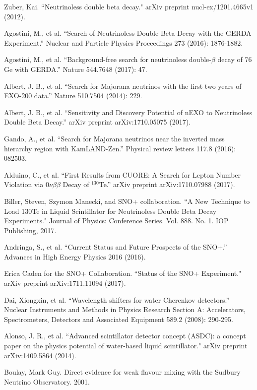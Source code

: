 \documentclass[preprint,12pt]{elsarticle}
\numberwithin{equation}{section}
\begin{document}
\begin{thebibliography}{00}
 Zuber, Kai. ``Neutrinoless double beta decay." arXiv preprint nucl-ex/1201.4665v1 (2012).

 Agostini, M., et al. ``Search of Neutrinoless Double Beta Decay with the GERDA Experiment.'' Nuclear and Particle Physics Proceedings 273 (2016): 1876-1882. 

 Agostini, M., et al. ``Background-free search for neutrinoless double-$\beta$ decay of 76 Ge with GERDA.'' Nature 544.7648 (2017): 47.

 Albert, J. B., et al. ``Search for Majorana neutrinos with the first two years of EXO-200 data.'' Nature 510.7504 (2014): 229.

 Albert, J. B., et al. ``Sensitivity and Discovery Potential of nEXO to Neutrinoless Double Beta Decay.'' arXiv preprint arXiv:1710.05075 (2017).


 Gando, A., et al. ``Search for Majorana neutrinos near the inverted mass hierarchy region with KamLAND-Zen.'' Physical review letters 117.8 (2016): 082503.

 Alduino, C., et al. ``First Results from CUORE: A Search for Lepton Number Violation via $0\nu\beta\beta$ Decay of $^{130}$Te.'' arXiv preprint arXiv:1710.07988 (2017).

Biller, Steven, Szymon Manecki, and SNO+ collaboration. ``A New Technique to Load 130Te in Liquid Scintillator for Neutrinoless Double Beta Decay Experiments." Journal of Physics: Conference Series. Vol. 888. No. 1. IOP Publishing, 2017.

 Andringa, S., et al. ``Current Status and Future Prospects of the SNO+.'' Advances in High Energy Physics 2016 (2016).

 Erica Caden for the SNO+ Collaboration. ``Status of the SNO+ Experiment." arXiv preprint arXiv:1711.11094 (2017).


 Dai, Xiongxin, et al. ``Wavelength shifters for water Cherenkov detectors.'' Nuclear Instruments and Methods in Physics Research Section A: Accelerators, Spectrometers, Detectors and Associated Equipment 589.2 (2008): 290-295.

 Alonso, J. R., et al. ``Advanced scintillator detector concept (ASDC): a concept paper on the physics potential of water-based liquid scintillator." arXiv preprint arXiv:1409.5864 (2014).

 Boulay, Mark Guy. Direct evidence for weak flavour mixing with the Sudbury Neutrino Observatory. 2001.



\end{thebibliography}
\end{document}
